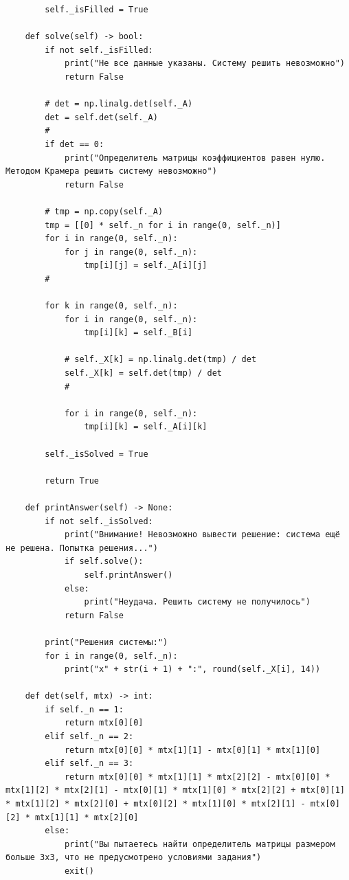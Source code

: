 \documentclass[12pt,a4paper]{scrartcl}
\begin{document}
\begin{verbatim}
        self._isFilled = True
    
    def solve(self) -> bool:
        if not self._isFilled:
            print("Не все данные указаны. Систему решить невозможно")
            return False
        
        # det = np.linalg.det(self._A)
        det = self.det(self._A)
        # 
        if det == 0:
            print("Определитель матрицы коэффициентов равен нулю. Методом Крамера решить систему невозможно")
            return False

        # tmp = np.copy(self._A)
        tmp = [[0] * self._n for i in range(0, self._n)]
        for i in range(0, self._n):
            for j in range(0, self._n):
                tmp[i][j] = self._A[i][j]
        # 

        for k in range(0, self._n):
            for i in range(0, self._n):
                tmp[i][k] = self._B[i]
            
            # self._X[k] = np.linalg.det(tmp) / det
            self._X[k] = self.det(tmp) / det
            # 
            
            for i in range(0, self._n):
                tmp[i][k] = self._A[i][k]
        
        self._isSolved = True

        return True
    
    def printAnswer(self) -> None:
        if not self._isSolved:
            print("Внимание! Невозможно вывести решение: система ещё не решена. Попытка решения...")
            if self.solve():
                self.printAnswer()
            else:
                print("Неудача. Решить систему не получилось")
            return False
        
        print("Решения системы:")
        for i in range(0, self._n):
            print("x" + str(i + 1) + ":", round(self._X[i], 14))
    
    def det(self, mtx) -> int:
        if self._n == 1:
            return mtx[0][0]
        elif self._n == 2:
            return mtx[0][0] * mtx[1][1] - mtx[0][1] * mtx[1][0]
        elif self._n == 3:
            return mtx[0][0] * mtx[1][1] * mtx[2][2] - mtx[0][0] * mtx[1][2] * mtx[2][1] - mtx[0][1] * mtx[1][0] * mtx[2][2] + mtx[0][1] * mtx[1][2] * mtx[2][0] + mtx[0][2] * mtx[1][0] * mtx[2][1] - mtx[0][2] * mtx[1][1] * mtx[2][0]
        else:
            print("Вы пытаетесь найти определитель матрицы размером больше 3x3, что не предусмотрено условиями задания")
            exit()


\end{verbatim}
\end{document}
